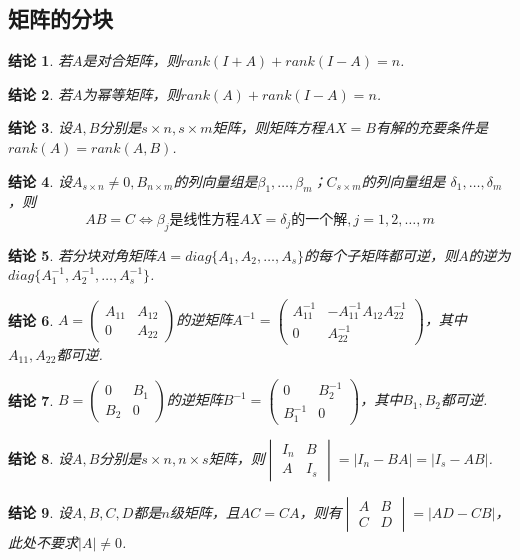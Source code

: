 \documentclass[UTF8]{article}
\newtheorem{ccl}{结论}[subsection]
\begin{document}
\subsection{矩阵的分块}
\begin{ccl}
  若$A$是对合矩阵，则$rank(I+A)+rank(I-A)=n$.
\end{ccl}
\begin{ccl}
  若$A$为幂等矩阵，则$rank(A)+rank(I-A)=n$.
\end{ccl}
\begin{ccl}
  设$A,B$分别是$s\times n,s\times m$矩阵，则矩阵方程$AX=B$有解的充要条件是$rank(A)=rank(A, B)$.
\end{ccl}
\begin{ccl}
  设$A_{s\times n}\ne 0,B_{n\times m}$的列向量组是$\beta_1,\ldots,\beta_m$；$C_{s\times m}$的列向量组是
  $\delta_1,\ldots,\delta_m$，则\[
  AB=C\Longleftrightarrow \beta_j\text{是线性方程}AX=\delta_j \text{的一个解},j=1,2,\ldots,m
  \]
\end{ccl}
\begin{ccl}
  若分块对角矩阵$A=diag\{A_1,A_2,\ldots,A_s\}$的每个子矩阵都可逆，则$A$的逆为$diag\{A_1^{-1},A_2^{-1},\ldots,A_s^{-1}\}$.
\end{ccl}
\begin{ccl}
  $A=\begin{pmatrix} A_{11} & A_{12}\\ 0 & A_{22}\end{pmatrix}$的逆矩阵$A^{-1}=\begin{pmatrix} A_{11}^{-1} & -A_{11}^{-1}A_{12}A_{22}^{-1}\\
  0 & A_{22}^{-1}\end{pmatrix}$，其中$A_{11},A_{22}$都可逆.
\end{ccl}
\begin{ccl}
  $B=\begin{pmatrix} 0&B_1\\B_2&0 \end{pmatrix}$的逆矩阵$B^{-1}=\begin{pmatrix} 0&B_2^{-1}\\ B_1^{-1}&0 \end{pmatrix}$，其中$B_1,B_2$都可逆.
\end{ccl}
\begin{ccl}
  设$A,B$分别是$s\times n,n\times s$矩阵，则$\begin{vmatrix} I_n&B\\A&I_s\end{vmatrix}=|I_n-BA|=|I_s-AB|$.
\end{ccl}
\begin{ccl}
  设$A,B,C,D$都是$n$级矩阵，且$AC=CA$，则有$\begin{vmatrix} A&B\\C&D \end{vmatrix}=|AD-CB|$，此处不要求$|A|\ne 0$.
\end{ccl}
\end{document}
